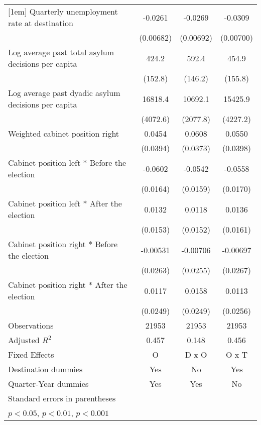 \begin{table}[htbp]
\begin{tabular}{l*{3}{c}}
[1em]
Quarterly unemployment rate at destination&     -0.0261\sym{***}&     -0.0269\sym{***}&     -0.0309\sym{***}\\
                    &   (0.00682)         &   (0.00692)         &   (0.00700)         \\
[1em]
Log average past total asylum decisions per capita&       424.2\sym{**} &       592.4\sym{***}&       454.9\sym{**} \\
                    &     (152.8)         &     (146.2)         &     (155.8)         \\
[1em]
Log average past dyadic asylum decisions per capita&     16818.4\sym{***}&     10692.1\sym{***}&     15425.9\sym{***}\\
                    &    (4072.6)         &    (2077.8)         &    (4227.2)         \\
[1em]
Weighted cabinet position right&      0.0454         &      0.0608         &      0.0550         \\
                    &    (0.0394)         &    (0.0373)         &    (0.0398)         \\
[1em]
Cabinet position left * Before the election&     -0.0602\sym{***}&     -0.0542\sym{**} &     -0.0558\sym{**} \\
                    &    (0.0164)         &    (0.0159)         &    (0.0170)         \\
[1em]
Cabinet position left * After the election&      0.0132         &      0.0118         &      0.0136         \\
                    &    (0.0153)         &    (0.0152)         &    (0.0161)         \\
[1em]
Cabinet position right * Before the election&    -0.00531         &    -0.00706         &    -0.00697         \\
                    &    (0.0263)         &    (0.0255)         &    (0.0267)         \\
[1em]
Cabinet position right * After the election&      0.0117         &      0.0158         &      0.0113         \\
                    &    (0.0249)         &    (0.0249)         &    (0.0256)         \\
\hline
Observations        &       21953         &       21953         &       21953         \\
Adjusted \(R^{2}\)  &       0.457         &       0.148         &       0.456         \\
Fixed Effects       &           O         &       D x O         &       O x T         \\
Destination dummies &         Yes         &          No         &         Yes         \\
Quarter-Year dummies&         Yes         &         Yes         &          No         \\
\hline\hline
\multicolumn{4}{l}{\footnotesize Standard errors in parentheses}\\
\multicolumn{4}{l}{\footnotesize \sym{*} \(p<0.05\), \sym{**} \(p<0.01\), \sym{***} \(p<0.001\)}\\
\end{tabular}
\end{table}
